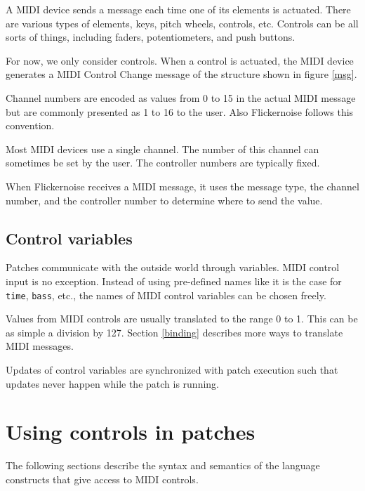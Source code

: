 \documentclass[11pt,a4paper]{article}
\begin{document}
A MIDI device sends a message each time one of its elements is actuated.
There are various types of elements, keys, pitch wheels, controls, etc.
Controls can be all sorts of things, including faders, potentiometers,
and push buttons.

For now, we only consider controls. When a control is actuated, the
MIDI device generates a MIDI Control Change message of the structure
shown in figure \ref{msg}.

Channel numbers are encoded as values from 0 to 15 in the actual
MIDI message but are commonly presented as 1 to 16 to the user.
Also Flickernoise follows this convention.

Most MIDI devices use a single channel. The number of this channel
can sometimes be set by the user. The controller numbers are typically
fixed.

When Flickernoise receives a MIDI message, it
uses the message type, the channel number, and the controller
number to determine where to send the value. 

\figmsg




\subsection{Control variables}

Patches communicate with the outside world through variables. MIDI
control input is no exception. Instead of using pre-defined names
like it is the case for {\tt time}, {\tt bass}, etc., the names of
MIDI control variables can be chosen freely.

Values from MIDI controls are usually translated to
the range 0 to 1. This can be as simple a division by 127.
Section \ref{binding} describes more ways to translate MIDI messages.

Updates of control variables are synchronized with patch execution
such that updates never happen while the patch is running.




\section{Using controls in patches}

The following sections describe the syntax and semantics of the
language constructs that give access to MIDI controls.
\end{document}
